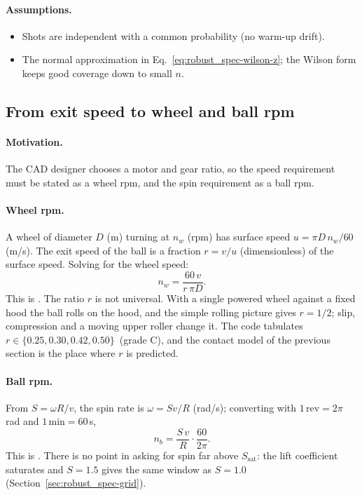 \paragraph{Assumptions.}
\begin{itemize}
  \item Shots are independent with a common probability (no warm-up drift).
  \item The normal approximation in Eq.~\eqref{eq:robust_spec-wilson-z}; the Wilson form keeps good coverage
    down to small $n$.
\end{itemize}

\subsection{From exit speed to wheel and ball rpm}
\label{sec:robust_spec-rpm}

\paragraph{Motivation.}
The CAD designer chooses a motor and gear ratio, so the speed requirement must be stated as a wheel
rpm, and the spin requirement as a ball rpm.

\paragraph{Wheel rpm.}
A wheel of diameter $D$ (\unit{m}) turning at $n_w$ (rpm) has surface speed
$u=\pi D\,n_w/60$ (\unit{m/s}).
The exit speed of the ball is a fraction $r=v/u$ (dimensionless) of the surface speed.
Solving for the wheel speed:
\begin{equation}
  n_w = \frac{60\,v}{r\,\pi D}.
  \label{eq:robust_spec-wheel}
\end{equation}
This is .
The ratio $r$ is not universal.
With a single powered wheel against a fixed hood the ball rolls on the hood, and the simple
rolling picture gives $r=1/2$; slip, compression and a moving upper roller change it.
The code tabulates $r\in\{0.25, 0.30, 0.42, 0.50\}$\assumed\ (grade C), and the contact model of
the previous section is the place where $r$ is predicted.

\paragraph{Ball rpm.}
From $S=\omega R/v$, the spin rate is $\omega=Sv/R$ (\unit{rad/s}); converting with
$1\,\text{rev}=2\pi$\,\unit{rad} and $1\,\text{min}=60$\,\unit{s},
\begin{equation}
  n_b = \frac{S\,v}{R}\cdot\frac{60}{2\pi}.
  \label{eq:robust_spec-spinrpm}
\end{equation}
This is .
There is no point in asking for spin far above $S_{\mathrm{sat}}$: the lift coefficient saturates
and $S=1.5$ gives the same window as $S=1.0$ (Section~\ref{sec:robust_spec-grid}).

